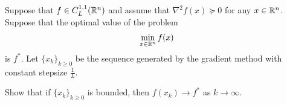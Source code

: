 \documentclass{ExerciseSheet}
\newif\ifsolutions
\begin{document}
\fi

\vskip 0.5cm
\begin{problem}
Suppose that $f \in C^{1,1}_L(\mathbb{R}^n)$ and assume that $\nabla^2 f(x) \succcurlyeq 0$ for any $x \in \mathbb{R}^n$. Suppose that the optimal value of the problem 
\begin{align*}
    \min_{x\in\mathbb{R}^n} f(x)
\end{align*} 
is $f^*$. Let $\{ x_k\}_{k \geq0}$ be the sequence generated by the gradient method with constant stepsize $\frac{1}{L}$. \vspace{0.3cm}

Show that if $\{ x_k\}_{k \geq0}$ is bounded, then $f(x_k) \to f^*$ as $k \to \infty$.

\end{problem}

\ifsolutions
\vskip 0.3cm
\end{document}
